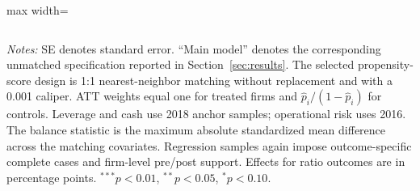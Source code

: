 \begin{table}[H]
\begin{adjustbox}{max width=\textwidth}
\begin{tabular}{lrrrrrr}
        \bottomrule
    \end{tabular}
    \end{adjustbox}
    \parbox{\textwidth}{\vspace{0.35em}\footnotesize\textit{Notes:} SE denotes standard error. ``Main model'' denotes the corresponding unmatched specification reported in Section~\ref{sec:results}. The selected propensity-score design is 1:1 nearest-neighbor matching without replacement and with a 0.001 caliper. \acs{ATT} weights equal one for treated firms and \(\widehat p_i/(1-\widehat p_i)\) for controls. Leverage and cash use 2018 anchor samples; operational risk uses 2016. The balance statistic is the maximum absolute standardized mean difference across the matching covariates. Regression samples again impose outcome-specific complete cases and firm-level pre/post support. Effects for ratio outcomes are in percentage points. \(^{***}p<0.01\), \(^{**}p<0.05\), \(^{*}p<0.10\).}
\end{table}
